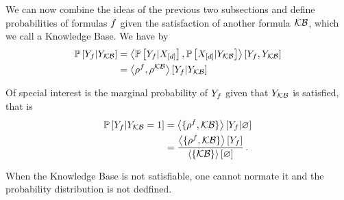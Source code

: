 We can now combine the ideas of the previous two subsections and define probabilities of formulas $f$ given the satisfaction of another formula $\mathcal{KB}$, which we call a Knowledge Base.
We have by  %
\begin{align*}
	\mathbb{P}\left[Y_{f}|Y_{\mathcal{KB}}\right] 
	& = \left\langle 
	\mathbb{P}\left[Y_{f}|X_{[d]}\right], \mathbb{P}\left[X_{[d]}|Y_{\mathcal{KB}}\right]
	\right\rangle \left[ Y_{f},Y_{\mathcal{KB}} \right] \\
	& = \left\langle \rho^{f} , \rho^{\mathcal{KB}}\right\rangle \left[ Y_{f} | Y_{\mathcal{KB}} \right]
\end{align*}

% 
Of special interest is the marginal probability of $Y_{f}$ given that $Y_{\mathcal{KB}}$ is satisfied, that is
\begin{align*}
	\mathbb{P}\left[Y_{f}|Y_{\mathcal{KB}}=1\right] 
	& = \left\langle \{\rho^{f} ,\mathcal{KB}\}\right\rangle \left[ Y_{f} | \varnothing \right]\\
	& = \frac{\left\langle \{\rho^{f},\mathcal{KB}\}\right\rangle \left[ Y_{f} \right]}{\left\langle \{\mathcal{KB}\}\right\rangle \left[ \varnothing \right]} \, . 
\end{align*}


\begin{remark}
	When the Knowledge Base is not satisfiable, one cannot normate it and the probability distribution is not dedfined.
\end{remark}




